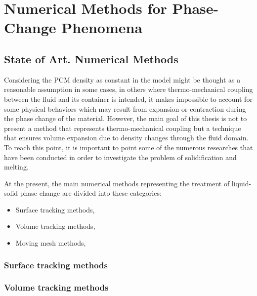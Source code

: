 
\chapter{Numerical Methods for Phase-Change Phenomena} %

\label{Chapter2} %


\section{State of Art. Numerical Methods} %
Considering the PCM density as constant in the model might be thought as a reasonable assumption in some cases, in others where thermo-mechanical coupling between the fluid and its container is intended, it makes impossible to account for some physical behaviors which may result from expansion or contraction during the phase change of the material. However, the main goal of this thesis is not to present a method that represents thermo-mechanical coupling but a technique that ensures volume expansion due to density changes through the fluid domain.
To reach this point, it is important to point some of the numerous researches that have been conducted in order to investigate the problem of solidification and melting. 
\newline

At the present, the main numerical methods representing the treatment of liquid-solid phase change are divided into these categories:
\begin{itemize}
	\item Surface tracking methods,
	\item Volume tracking methods,
	\item Moving mesh methods,
\end{itemize}
\subsection*{Surface tracking methods}

\subsection*{Volume tracking methods}

